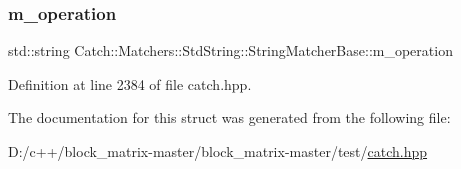 \subsubsection{\texorpdfstring{m\+\_\+operation}{m\_operation}}
{\footnotesize\ttfamily std\+::string Catch\+::\+Matchers\+::\+Std\+String\+::\+String\+Matcher\+Base\+::m\+\_\+operation}



Definition at line 2384 of file catch.\+hpp.



The documentation for this struct was generated from the following file\+:\begin{DoxyCompactItemize}
\item 
D\+:/c++/block\+\_\+matrix-\/master/block\+\_\+matrix-\/master/test/\mbox{\hyperlink{catch_8hpp}{catch.\+hpp}}\end{DoxyCompactItemize}
